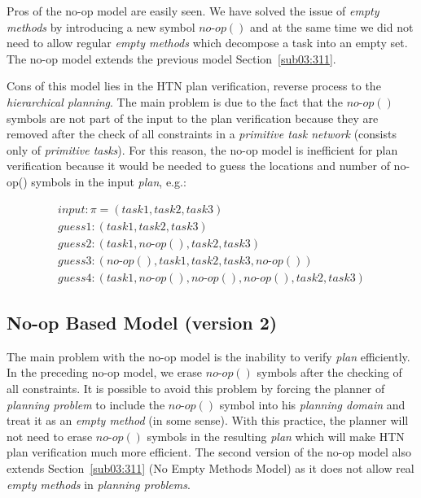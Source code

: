 \medskip\noindent
Pros of the no-op model are easily seen. We have solved the issue of \emph{empty methods} by introducing a new symbol $no\text{-}op()$ and at the same time we did not need to allow regular \emph{empty methods} which decompose a task into an empty set. The no-op model extends the previous model Section~\ref{sub03:311}.

\medskip\noindent
Cons of this model lies in the HTN plan verification, reverse process to the \emph{hierarchical planning}. The main problem is due to the fact that the $no\text{-}op()$ symbols are not part of the input to the plan verification because they are removed after the check of all constraints in a \emph{primitive task network} (consists only of \emph{primitive tasks}). For this reason, the no-op model is inefficient for plan verification because it would be needed to guess the locations and number of no-op() symbols in the input \emph{plan}, e.g.:

\begin{gather*}
    input: \pi = (task1, task2, task3) \\
    guess 1: (task1, task2, task3) \\
    guess 2: (task1, no\text{-}op(), task2, task3) \\
    guess 3: (no\text{-}op(), task1, task2, task3, no\text{-}op()) \\
    guess 4: (task1, no\text{-}op(), no\text{-}op(), no\text{-}op(), task2, task3)
\end{gather*}

\subsection{No-op Based Model (version 2)}

\medskip\noindent
The main problem with the no-op model is the inability to verify \emph{plan} efficiently. In the preceding no-op model, we erase $no\text{-}op()$ symbols after the checking of all constraints. It is possible to avoid this problem by forcing the planner of \emph{planning problem} to include the $no\text{-}op()$ symbol into his \emph{planning domain} and treat it as an \emph{empty method} (in some sense). With this practice, the planner will not need to erase $no\text{-}op()$ symbols in the resulting \emph{plan} which will make HTN plan verification much more efficient. The second version of the no-op model also extends Section~\ref{sub03:311} (No Empty Methods Model) as it does not allow real \emph{empty methods} in \emph{planning problems}.

